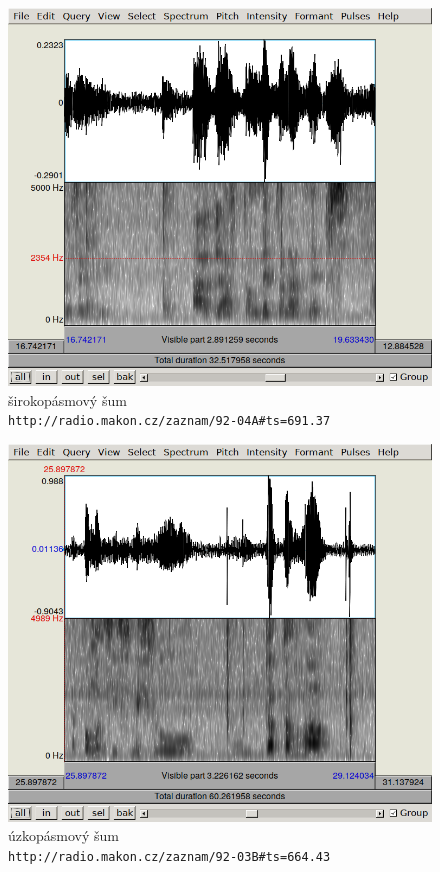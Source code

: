 \begin{figure}[htpb]
\includegraphics[scale=0.89]{rc/spectrum-noise-92-04A.png}
\caption{
    širokopásmový šum\\
    \texttt{http://radio.makon.cz/zaznam/92-04A\#ts=691.37}
}
\label{fig:spectr-noise}
\end{figure}

\begin{figure}[htpb]
\includegraphics[scale=0.89]{rc/spectrum-narrow-92-03B.png}
\caption{
    úzkopásmový šum\\
    \texttt{http://radio.makon.cz/zaznam/92-03B\#ts=664.43}
}
\label{fig:spectr-narrow}
\end{figure}

